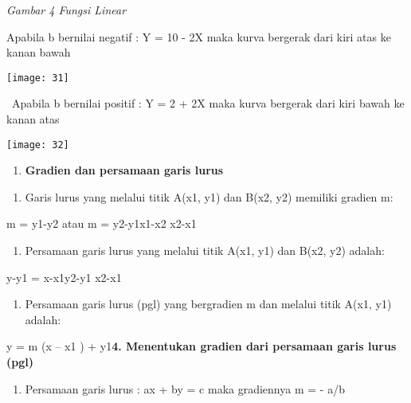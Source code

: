 \documentclass[11pt,fleqn]{book} %
\begin{document}
\begin{myEnumerate}
\begin{itemize}
\noindent 

\noindent 

\noindent \textit{Gambar 4  Fungsi Linear}

\noindent Apabila b bernilai negatif : Y = 10 - 2X maka kurva bergerak dari kiri atas ke kanan bawah

\begin{center}
\noindent \texttt{[image: 31]}
\end{center}

\noindent ~Apabila b bernilai positif : Y = 2 + 2X maka kurva bergerak dari kiri bawah ke kanan atas~~

\begin{center}
\noindent \texttt{[image: 32]}
\end{center}

\begin{enumerate}
\item  \textbf{Gradien dan persamaan garis lurus}
\end{enumerate}

\noindent 

\begin{enumerate}
\item  Garis lurus yang melalui titik A(x1, y1) dan B(x2, y2) memiliki gradien m:
\end{enumerate}

\noindent m = y1-y2 atau m = y2-y1x1-x2 x2-x1

\noindent 

\begin{enumerate}
\item  Persamaan garis lurus yang melalui titik A(x1, y1) dan B(x2, y2) adalah:
\end{enumerate}

\noindent y-y1 = x-x1y2-y1 x2-x1

\begin{enumerate}
\item  Persamaan garis lurus (pgl) yang bergradien m dan melalui titik A(x1, y1) adalah:
\end{enumerate}

y = m (x -- x1 ) + y1\textbf{4.  Menentukan gradien dari persamaan garis lurus (pgl)}

\textbf{}

\begin{enumerate}
\item \textbf{ }Persamaan garis lurus : ax + by = c maka gradiennya m = - a/b


\end{enumerate}
\end{itemize}
\end{myEnumerate}
\end{document}
